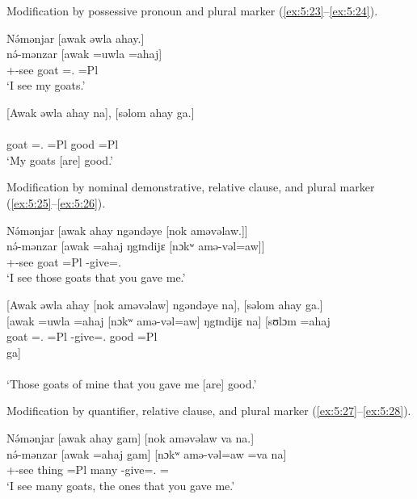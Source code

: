 Modification by possessive pronoun and plural marker (\ref{ex:5:23}--\ref{ex:5:24}). 

\ea \label{ex:5:23}
N\'{ə}mənjar  [awak  əwla  ahay.]\\
\gll  n\'{ə}-mənzar  [awak  =uwla    =ahaj]\\
      {\oneS}+{\IFV}-see  goat  ={\oneS}.{\POSS}  =Pl\\
\glt  ‘I see my goats.’
\z

\ea \label{ex:5:24}
{}[Awak  əwla  ahay  na],  [səlom  ahay  ga.]\\
\gll  [awak   =uwla    =ahaj     na]   [sʊlɔm   =ahaj   ga]\\
      goat    ={\oneS}.{\POSS}  =Pl  {\PSP}  good  =Pl  {\ADJ}\\
\glt  ‘My goats [are] good.’
\z

Modification by nominal demonstrative, relative clause, and plural marker (\ref{ex:5:25}--\ref{ex:5:26}). 

\ea \label{ex:5:25}
N\'{ə}mənjar  [awak  ahay  ngəndəye  [nok  aməvəlaw.]]\\
\gll  n\'{ə}-mənzar  [awak  =ahaj  ŋgɪndijɛ  [nɔkʷ  amə-vəl=aw]]\\
      {\oneS}+{\IFV}-see  goat  =Pl  {\DEM}  {\twoS}  {\DEP}-give={\oneS}.{\IO}\\
\glt  ‘I see those goats that you gave me.’
\z

\clearpage
\ea \label{ex:5:26}
{}[Awak  əwla  ahay  [nok aməvəlaw]  ngəndəye  na],  [səlom  ahay  ga.]\\
\gll  {}[awak   =uwla     =ahaj   [nɔkʷ   amə-vəl=aw]   ŋgɪndijɛ   na]   [sʊlɔm   =ahaj\\ 
      goat    ={\oneS}.{\POSS}  =Pl  {\twoS}  {\DEP}-give={\oneS}.{\IO}  {\DEM}  {\PSP}  good  =Pl\\  
      
      \medskip
\gll   ga]\\
       {\ADJ}\\
\glt  ‘Those goats of mine that you gave me [are] good.’ 
\z

Modification by quantifier, relative clause, and plural marker (\ref{ex:5:27}--\ref{ex:5:28}). 

\ea \label{ex:5:27}
N\'{ə}mənjar  [awak  ahay  gam]  [nok  aməvəlaw  va  na.]\\
\gll  n\'{ə}-mənzar  [awak  =ahaj   gam]   [nɔkʷ  amə-vəl=aw   =va   na]\\
      {\oneS}+{\IFV}-see  thing  =Pl  many  {\twoS}  {\DEP}-give={\oneS}.{\IO}  ={\PRF}  {\PSP}\\
\glt  ‘I see many goats, the ones that you gave me.’
\z

